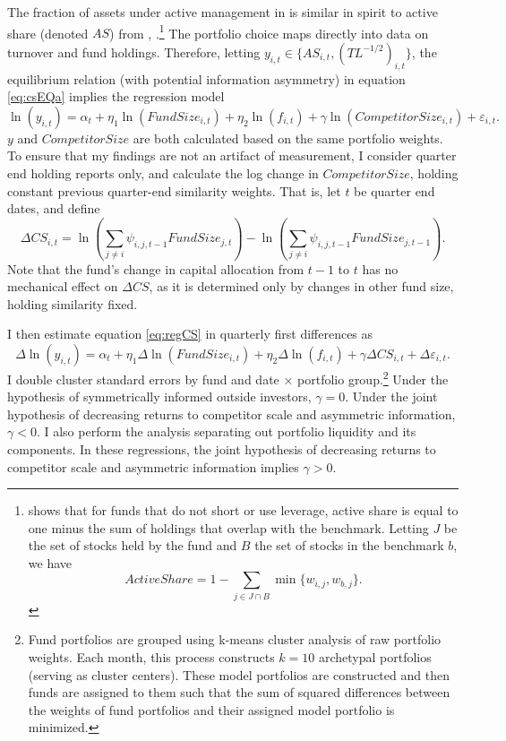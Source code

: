 \documentclass[openany]{book}
\let\rmarkdownfootnote\footnote%
\def\footnote{\protect\rmarkdownfootnote}
\theoremstyle{definition}
\theoremstyle{definition}
\theoremstyle{definition}
\theoremstyle{remark}
\begin{document}
The fraction of assets under active management in \citet{bg04} is
similar in spirit to active share (denoted \(AS\)) from \citet{cp09},
\citet{petajisto13}.\footnote{\citet{cremers17} shows that for funds
  that do not short or use leverage, active share is equal to one minus
  the sum of holdings that overlap with the benchmark. Letting \(J\) be
  the set of stocks held by the fund and \(B\) the set of stocks in the
  benchmark \(b\), we have
  \[ ActiveShare=1-\sum_{j\in J\cap B} \min\{ w_{i,j},w_{b,j} \}.\]} The
\citet{pst17L} portfolio choice maps directly into data on turnover and
fund holdings. Therefore, letting
\(y_{i,t}\in\{AS_{i,t},\left(TL^{-1/2}\right)_{i,t}\}\), the equilibrium
relation (with potential information asymmetry) in equation
\eqref{eq:csEQa} implies the regression model \begin{equation}
\ln(y_{i,t})=\alpha_t + \eta_1 \ln(FundSize_{i,t}) +\eta_2 \ln(f_{i,t}) + \gamma\ln(CompetitorSize_{i,t}) + \varepsilon_{i,t}.
\label{eq:regCS}
\end{equation} \(y\) and \(CompetitorSize\) are both calculated based on
the same portfolio weights. To ensure that my findings are not an
artifact of measurement, I consider quarter end holding reports only,
and calculate the log change in \(CompetitorSize\), holding constant
previous quarter-end similarity weights. That is, let \(t\) be quarter
end dates, and define \begin{equation}
\Delta CS_{i,t}=\ln \left(\sum_{j\neq i} \psi_{i,j,t-1} FundSize_{j,t}\right) - \ln \left(\sum_{j\neq i} \psi_{i,j,t-1} FundSize_{j,t-1}\right).
\end{equation} Note that the fund's change in capital allocation from
\(t-1\) to \(t\) has no mechanical effect on \(\Delta CS\), as it is
determined only by changes in other fund size, holding similarity fixed.

I then estimate equation \eqref{eq:regCS} in quarterly first differences
as \begin{equation}
\Delta\ln(y_{i,t})=\alpha_t + \eta_1 \Delta\ln(FundSize_{i,t}) +\eta_2 \Delta\ln(f_{i,t}) + \gamma\Delta CS_{i,t} + \Delta\varepsilon_{i,t}.
\label{eq:fdReg}
\end{equation} I double cluster standard errors by fund and date
\(\times\) portfolio group.\footnote{
Fund portfolios are grouped using k-means cluster analysis of raw portfolio weights. Each month, this process constructs $k=10$ archetypal portfolios (serving as cluster centers). These model portfolios are constructed and then funds are assigned to them such that the sum of squared differences between the weights of fund portfolios and their assigned model portfolio is minimized.
} Under the hypothesis of symmetrically informed outside investors,
\(\gamma=0\). Under the joint hypothesis of decreasing returns to
competitor scale and asymmetric information, \(\gamma<0\). I also
perform the analysis separating out portfolio liquidity and its
components. In these regressions, the joint hypothesis of decreasing
returns to competitor scale and asymmetric information implies
\(\gamma>0\).
\end{document}
